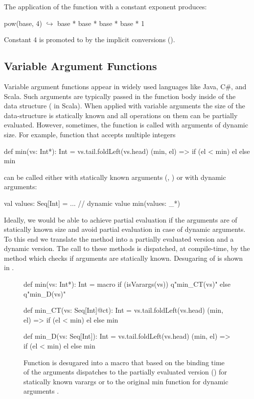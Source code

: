  The application of the function  with a constant
 exponent produces:

\begin{lstparagraph}
pow(base, 4)
  $\hookrightarrow$ base * base * base * base * 1
\end{lstparagraph}

Constant 4 is promoted to  by the implicit conversions ().

\subsection{Variable Argument Functions}
\label{sct:varargs}

Variable argument functions appear in widely used languages like Java, C\#, and Scala.
 Such arguments are typically passed in the function body inside of the data structure
 (\eg {} in Scala). When applied with variable arguments the size of the
 data-structure is statically known and all operations on them can be partially
 evaluated. However, sometimes, the function is called with arguments of dynamic size.
 For example, function  that accepts multiple integers\begin{lstparagraph}
def min(vs: Int*): Int = vs.tail.foldLeft(vs.head) {
  (min, el) => if (el < min) el else min
}
\end{lstparagraph}can be called either with statically known arguments
 (\eg, ) or with dynamic arguments:\begin{lstparagraph}
val values: Seq[Int] = ... // dynamic value
min(values: _*)
\end{lstparagraph}

Ideally, we would be able to achieve partial evaluation if the arguments are of statically
known size and avoid partial evaluation in case of dynamic arguments. To this end we translate
the method  into a partially evaluated version and a dynamic version. The call to these
methods is dispatched, at compile-time, by the  method which checks if
arguments are statically known. Desugaring of  is shown in .

\begin{figure}
\begin{listingtiny}
def min(vs: Int*): Int = macro
  if (isVarargs(vs)) q"min_CT(vs)"
  else q"min_D(vs)"

def min_CT(vs: Seq[Int]@ct): Int =
  vs.tail.foldLeft(vs.head) { (min, el) =>
    if (el < min) el else min
  }

def min_D(vs: Seq[Int]): Int =
  vs.tail.foldLeft(vs.head) {
    (min, el) => if (el < min) el else min
  }
\end{listingtiny}
\caption{Function  is desugared into a  macro that based on the
binding time of the arguments dispatches to the partially evaluated version ()
for statically known varargs or to the original min function for dynamic arguments .}
\label{fig:min}
\end{figure}

